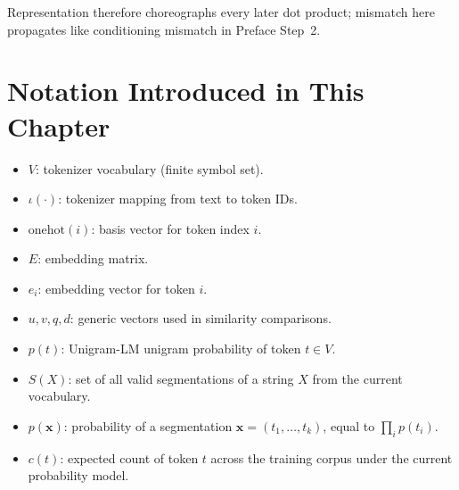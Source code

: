 Representation therefore choreographs every later dot product; mismatch here propagates like conditioning mismatch in Preface Step~2.

\section*{Notation Introduced in This Chapter}
\begin{itemize}[leftmargin=1.5em]
  \item $V$: tokenizer vocabulary (finite symbol set).
  \item $\iota(\cdot)$: tokenizer mapping from text to token IDs.
  \item $\mathrm{onehot}(i)$: basis vector for token index $i$.
  \item $E$: embedding matrix.
  \item $e_i$: embedding vector for token $i$.
  \item $u,v,q,d$: generic vectors used in similarity comparisons.
  \item $p(t)$: Unigram-LM unigram probability of token $t \in V$.
  \item $S(X)$: set of all valid segmentations of a string $X$ from the current vocabulary.
  \item $p(\mathbf{x})$: probability of a segmentation $\mathbf{x} = (t_1,\dots,t_k)$, equal to $\prod_i p(t_i)$.
  \item $c(t)$: expected count of token $t$ across the training corpus under the current probability model.
\end{itemize}

